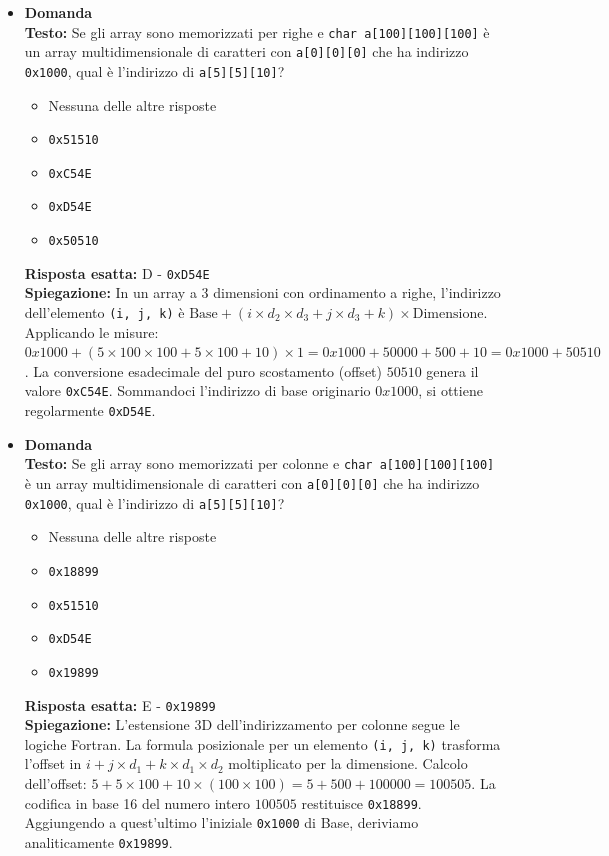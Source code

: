 \documentclass[12pt, a4paper]{article}
\newcounter{domandateoria}
\begin{document}
\begin{itemize}
\item {}\textbf{Domanda \thedomandateoria} \\
\textbf{Testo:} Se gli array sono memorizzati per righe e \texttt{char a[100][100][100]} è un array multidimensionale di caratteri con \texttt{a[0][0][0]} che ha indirizzo \texttt{0x1000}, qual è l'indirizzo di \texttt{a[5][5][10]}?
\begin{itemize}
    \item[A)] Nessuna delle altre risposte
    \item[B)] \texttt{0x51510}
    \item[C)] \texttt{0xC54E}
    \item[D)] \texttt{0xD54E}
    \item[E)] \texttt{0x50510}
\end{itemize}
\textbf{Risposta esatta:} D - \texttt{0xD54E} \\
\textbf{Spiegazione:} In un array a 3 dimensioni con ordinamento a righe, l'indirizzo dell'elemento \texttt{(i, j, k)} è $\text{Base} + (i \times d_2 \times d_3 + j \times d_3 + k) \times \text{Dimensione}$.
Applicando le misure: $0x1000 + (5 \times 100 \times 100 + 5 \times 100 + 10) \times 1 = 0x1000 + 50000 + 500 + 10 = 0x1000 + 50510$.
La conversione esadecimale del puro scostamento (offset) $50510$ genera il valore \texttt{0xC54E}. Sommandoci l'indirizzo di base originario $0x1000$, si ottiene regolarmente \texttt{0xD54E}.
\vspace{0.3cm}

\item {}\textbf{Domanda \thedomandateoria} \\
\textbf{Testo:} Se gli array sono memorizzati per colonne e \texttt{char a[100][100][100]} è un array multidimensionale di caratteri con \texttt{a[0][0][0]} che ha indirizzo \texttt{0x1000}, qual è l'indirizzo di \texttt{a[5][5][10]}?
\begin{itemize}
    \item[A)] Nessuna delle altre risposte
    \item[B)] \texttt{0x18899}
    \item[C)] \texttt{0x51510}
    \item[D)] \texttt{0xD54E}
    \item[E)] \texttt{0x19899}
\end{itemize}
\textbf{Risposta esatta:} E - \texttt{0x19899} \\
\textbf{Spiegazione:} L'estensione 3D dell'indirizzamento per colonne segue le logiche Fortran. La formula posizionale per un elemento \texttt{(i, j, k)} trasforma l'offset in $i + j \times d_1 + k \times d_1 \times d_2$ moltiplicato per la dimensione.
Calcolo dell'offset: $5 + 5 \times 100 + 10 \times (100 \times 100) = 5 + 500 + 100000 = 100505$.
La codifica in base 16 del numero intero $100505$ restituisce \texttt{0x18899}. Aggiungendo a quest'ultimo l'iniziale \texttt{0x1000} di Base, deriviamo analiticamente \texttt{0x19899}.
\vspace{0.3cm}


\end{itemize}
\end{document}
